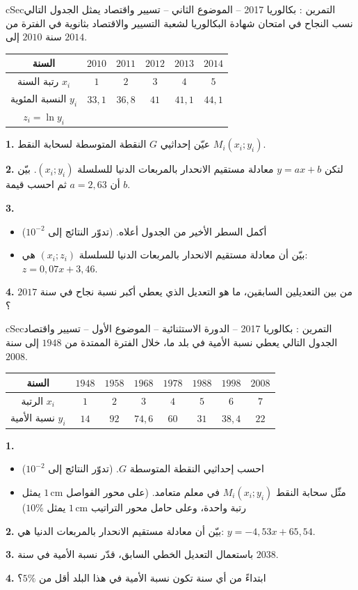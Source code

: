 \documentclass[12pt,a4paper]{article}
\newenvironment{BOX}[2]{\begin{otherlanguage}{english}\begin{arbox}{#1}{#2}}{\end{arbox}\end{otherlanguage}}
\newcounter{exo}
\newenvironment{tamrin}[1]{\stepcounter{exo}\begin{BOX}{cSec}{التمرين \theexo: #1}}{\end{BOX}}
\newenvironment{sq}{\begin{itemize}[leftmargin=2.4em,itemsep=3pt]}{\end{itemize}}
\newcommand{\qa}{\item[(أ)]}\newcommand{\qb}{\item[(ب)]}\newcommand{\qc}{\item[(جـ)]}\newcommand{\qd}{\item[(د)]}\newcommand{\qe}{\item[(هـ)]}
\newcommand{\QQ}[1]{\par\smallskip\textbf{#1.} }
\begin{document}
\begin{tamrin}{بكالوريا 2017 -- الموضوع الثاني -- تسيير واقتصاد}
يمثل الجدول التالي نسب النجاح في امتحان شهادة البكالوريا لشعبة التسيير والاقتصاد بثانوية في الفترة من سنة $2010$ إلى $2014$.
\begin{center}
\begin{tabular}{|C|c|c|c|c|c|}\hline
{} السنة & $2010$ & $2011$ & $2012$ & $2013$ & $2014$\\\hline
رتبة السنة $x_i$ & $1$ & $2$ & $3$ & $4$ & $5$\\\hline
النسبة المئوية $y_i$ & $33{,}1$ & $36{,}8$ & $41$ & $41{,}1$ & $44{,}1$\\\hline
$z_i=\ln y_i$ &  &  &  &  & \\\hline
\end{tabular}
\end{center}

\QQ{1} عيّن إحداثيي $G$ النقطة المتوسطة لسحابة النقط $M_i(x_i;y_i)$.
\QQ{2} لتكن $y=ax+b$ معادلة مستقيم الانحدار بالمربعات الدنيا للسلسلة $(x_i;y_i)$. بيّن أن $a=2{,}63$ ثم احسب قيمة $b$.
\QQ{3}
\begin{sq}
\qa أكمل السطر الأخير من الجدول أعلاه. (تدوّر النتائج إلى $10^{-2}$)
\qb بيّن أن معادلة مستقيم الانحدار بالمربعات الدنيا للسلسلة $(x_i;z_i)$ هي: $z=0{,}07x+3{,}46$.
\end{sq}
\QQ{4} من بين التعديلين السابقين، ما هو التعديل الذي يعطي أكبر نسبة نجاح في سنة $2017$؟
\end{tamrin}
\Needspace{14cm}

\begin{tamrin}{بكالوريا 2017 -- الدورة الاستثنائية -- الموضوع الأول -- تسيير واقتصاد}
الجدول التالي يعطي نسبة الأمية في بلد ما، خلال الفترة الممتدة من $1948$ إلى سنة $2008$.
\begin{center}
\begin{tabular}{|C|c|c|c|c|c|c|c|}\hline
{} السنة & $1948$ & $1958$ & $1968$ & $1978$ & $1988$ & $1998$ & $2008$\\\hline
الرتبة $x_i$ & $1$ & $2$ & $3$ & $4$ & $5$ & $6$ & $7$\\\hline
نسبة الأمية $y_i$ & $14$ & $92$ & $74{,}6$ & $60$ & $31$ & $38{,}4$ & $22$\\\hline
\end{tabular}
\end{center}

\QQ{1}
\begin{sq}
\qa احسب إحداثيي النقطة المتوسطة $G$. (تدوّر النتائج إلى $10^{-2}$)
\qb مثّل سحابة النقط $M_i(x_i;y_i)$ في معلم متعامد. (على محور الفواصل $1\,\text{cm}$ يمثل رتبة واحدة، وعلى حامل محور التراتيب $1\,\text{cm}$ يمثل $10\%$)
\end{sq}
\QQ{2} بيّن أن معادلة مستقيم الانحدار بالمربعات الدنيا هي: $y=-4{,}53x+65{,}54$.
\QQ{3} باستعمال التعديل الخطي السابق، قدّر نسبة الأمية في سنة $2038$.
\QQ{4} ابتداءً من أي سنة تكون نسبة الأمية في هذا البلد أقل من $5\%$؟
\end{tamrin}
\Needspace{15cm}
\end{document}
